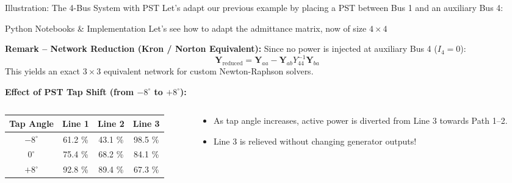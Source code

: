 \begin{frame}[allowframebreaks]{Illustration: The 4-Bus System with PST}
Let's adapt our previous example by placing a PST between Bus 1 and an auxiliary Bus 4:
\begin{center}

\end{center}

\newpage 


\begin{block}{Python Notebooks \& Implementation}
    Let's see how to adapt the admittance matrix, now of size $4\times 4$ \\ 
\centering
\href{https://github.com/bcornelusse/ELEC0447-analysis-power-systems/blob/master/notebooks/PF_3_transformer_gen_limits_pandapower.ipynb}{}
\hspace{0.5cm}
\href{https://github.com/bcornelusse/ELEC0447-analysis-power-systems/blob/master/notebooks/power_flow_3-bus-transformer_and_gen_limits_Newton-Raphson.py}{}
\end{block}
\vspace{0.2cm}
\textbf{Remark -- Network Reduction (Kron / Norton Equivalent):}
Since no power is injected at auxiliary Bus 4 ($I_4 = 0$):
$$\mathbf{Y}_{\text{reduced}} = \mathbf{Y}_{aa} - \mathbf{Y}_{ab} Y_{44}^{-1} \mathbf{Y}_{ba}$$
This yields an exact $3 \times 3$ equivalent network for custom Newton-Raphson solvers.



\newpage
\textbf{Effect of PST Tap Shift (from $-8^\circ$ to $+8^\circ$):}
\begin{columns}
    \begin{column}{0.5\textwidth}
        \begin{table}[h]
            \centering
            \small
            \begin{tabular}{cccc}
                \toprule
                \textbf{Tap Angle} & \textbf{Line 1} & \textbf{Line 2} & \textbf{Line 3} \\
                \midrule
                $-8^\circ$ & 61.2 \% & 43.1 \% & \alert{98.5 \%} \\
                $0^\circ$  & 75.4 \% & 68.2 \% & 84.1 \% \\
                $+8^\circ$ & \alert{92.8 \%} & 89.4 \% & 67.3 \% \\
                \bottomrule
            \end{tabular}
        \end{table}
    \end{column}
    \begin{column}{0.5\textwidth}
        \small
        \begin{itemize}
            \item As tap angle increases, active power is diverted from Line 3 towards Path 1--2.
            \item Line 3 is relieved without changing generator outputs!
        \end{itemize}
    \end{column}
\end{columns}
\end{frame}
